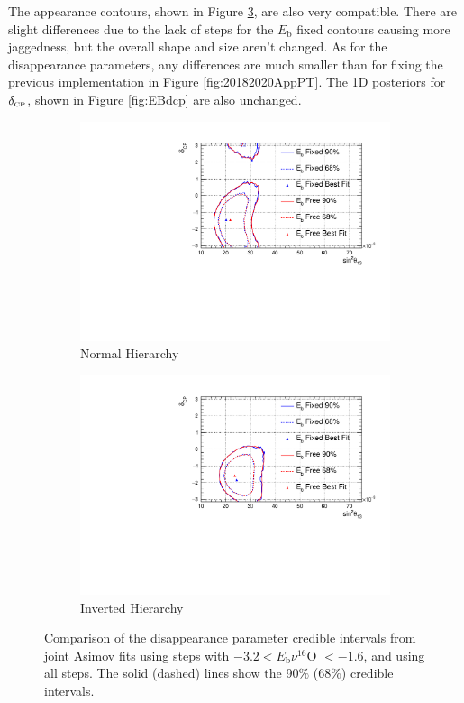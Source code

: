 The appearance contours, shown in Figure \ref{fig:EBApp}, are also very compatible. There are slight differences due to the lack of steps for the $E_{\mathrm{b}}$ fixed contours causing more jaggedness, but the overall shape and size aren't changed. As for the disappearance parameters, any differences are much smaller than for fixing the previous implementation in Figure \ref{fig:20182020AppPT}. The 1D posteriors for $\delta_{\scriptscriptstyle\mathrm{CP}}$, shown in Figure \ref{fig:EBdcp} are also unchanged. 

\begin{figure}[!htbp]
\centering
\begin{subfigure}{.7\textwidth}
  \centering
  \includegraphics[width=0.95\linewidth]{figs/compMaCh3Contours_EB_asimov/compMaCh3Contours_EB_app_asimovA_NH}
  \caption{Normal Hierarchy}
  \label{fig:EBAppNH}
\end{subfigure}
\begin{subfigure}{.7\textwidth}
  \centering
  \includegraphics[width=0.95\linewidth]{figs/compMaCh3Contours_EB_asimov/compMaCh3Contours_EB_app_asimovA_IH}
  \caption{Inverted Hierarchy}
  \label{fig:EBAppIH}
\end{subfigure}
\caption{Comparison of the disappearance parameter credible intervals from joint Asimov fits using steps with $ -3.2 < E_{\mathrm{b}} \nu ^{16}$O $< -1.6$, and using all steps. The solid (dashed) lines show the 90$\%$ ($68\%$) credible intervals.}
\label{fig:EBApp}
\end{figure}

